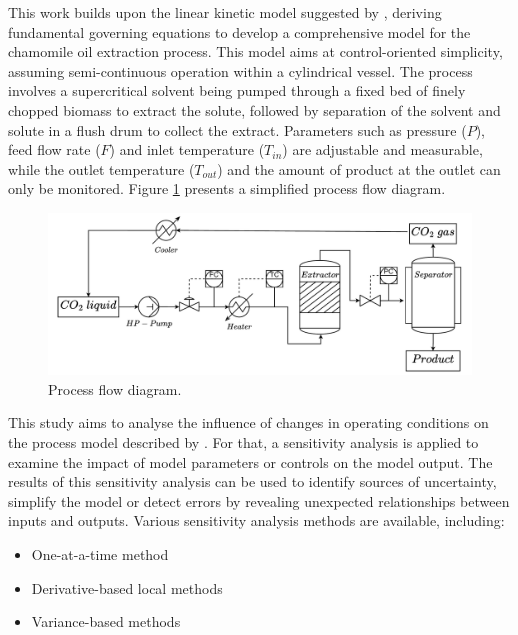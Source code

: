 \documentclass[a4paper,fleqn]{cas-dc}
\begin{document}
	This work builds upon the linear kinetic model suggested by \citet{Reverchon1996}, deriving fundamental governing equations to develop a comprehensive model for the chamomile oil extraction process. This model aims at control-oriented simplicity, assuming semi-continuous operation within a cylindrical vessel. The process involves a supercritical solvent being pumped through a fixed bed of finely chopped biomass to extract the solute, followed by separation of the solvent and solute in a flush drum to collect the extract. Parameters such as pressure ($P$), feed flow rate ($F$) and inlet temperature ($T_{in}$) are adjustable and measurable, while the outlet temperature ($T_{out}$) and the amount of product at the outlet can only be monitored. Figure \ref{fig: SFE_drawing} presents a simplified process flow diagram.
	
	\begin{figure}[h!]
		\centering
		\includegraphics[width=\columnwidth]{Figures/PFD.drawio.pdf}
		\caption{Process flow diagram.}
		\label{fig: SFE_drawing}
	\end{figure}
	
	This study aims to analyse the influence of changes in operating conditions on the process model described by \citet{Sliczniuk2024}. For that, a sensitivity analysis is applied to examine the impact of model parameters or controls on the model output. The results of this sensitivity analysis can be used to identify sources of uncertainty, simplify the model or detect errors by revealing unexpected relationships between inputs and outputs. Various sensitivity analysis methods are available, including:
	
	\begin{itemize}
		\item One-at-a-time method
		\item Derivative-based local methods
		\item Variance-based methods
	\end{itemize}
	
\end{document}
